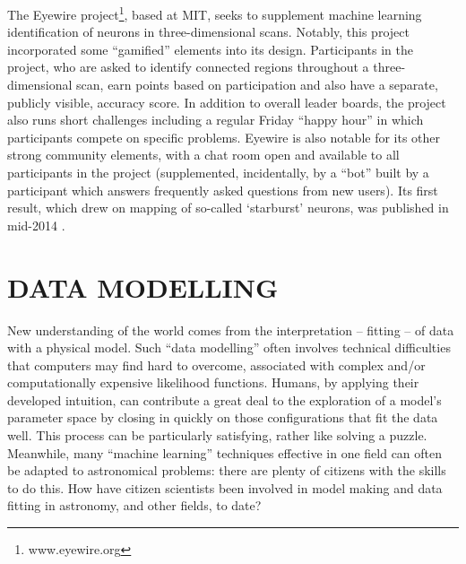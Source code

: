 \documentclass{ar2e}
\begin{document}
The Eyewire project\footnote{www.eyewire.org}, based at MIT, seeks to supplement machine learning
identification of neurons in three-dimensional scans. Notably, this project
incorporated some ``gamified'' elements into its design. Participants in the
project, who are asked to identify connected regions throughout a
three-dimensional scan, earn points based on participation and also have a
separate, publicly visible, accuracy score.  In addition to overall leader
boards, the project also runs short challenges including a regular Friday
``happy hour'' in which participants compete on specific problems. Eyewire is
also notable for its other strong community elements, with a chat room open and
available to all participants in the project (supplemented, incidentally, by a
``bot'' built by a participant which answers frequently asked questions from new
users). Its first result, which drew on mapping of so-called `starburst' neurons, was 
published in mid-2014 \citep{KimEyewire}.




\section{DATA MODELLING}
\label{sec:model}

New understanding of the world comes from the interpretation -- fitting -- of
data with a physical model. Such ``data modelling'' often involves technical
difficulties that computers may find hard to overcome, associated with complex
and/or computationally expensive likelihood functions. Humans, by applying their
developed intuition, can contribute a great deal to the exploration of a model's
parameter space by closing in quickly on those configurations that fit the data
well. This process can be particularly satisfying, rather like solving a puzzle.
Meanwhile, many ``machine learning'' techniques effective in one field can often
be adapted to astronomical problems: there are plenty of citizens with the
skills to do this. How have citizen scientists been involved in model making and
data fitting in astronomy, and other fields, to date?

\end{document}
